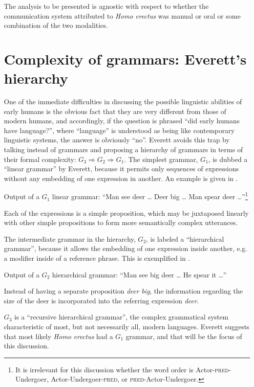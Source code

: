 \documentclass[output=paper,colorlinks,citecolor=brown]{langscibook}
\begin{document}
The analysis to be presented is agnostic with respect to whether the communication system attributed to \emph{Homo erectus} was manual or oral or some combination of the two modalities.

\section{Complexity of grammars: Everett’s hierarchy}\label{sec:vanvalin:2}
One of the immediate difficulties in discussing the possible linguistic abilities of early humans is the obvious fact that they are very different from those of modern humans, and accordingly, if the question is phrased “did early humans have language?”, where “language” is understood as being like contemporary linguistic systems, the answer is obviously “no”.  Everett avoids this trap by talking instead of grammars and proposing a hierarchy of grammars in terms of their formal complexity: $G_3 \Rightarrow G_2 \Rightarrow G_1$.  The simplest grammar, $G_1$, is dubbed a “linear grammar” by Everett, because it permits only sequences of expressions without any embedding of one expression in another. An example is given in .

\ea \label{vanvalin_example_1}
Output of a $G_1$ linear grammar: “Man see deer \ldots{}  Deer big \ldots{}  Man spear deer \ldots”\footnote{It is irrelevant for this discussion whether the word order is Actor-\textsc{pred}-Undergoer, Actor-Undergoer-\textsc{pred}, or \textsc{pred}-Actor-Undergoer.}
\z

Each of the expressions is a simple proposition, which may be juxtaposed linearly with other simple propositions to form more semantically complex utterances.

The intermediate grammar in the hierarchy, $G_2$, is labeled a “hierarchical grammar”, because it allows the embedding of one expression inside another, e.g. a modifier inside of a reference phrase.  This is exemplified in .

\ea \label{vanvalin_example_2}
Output of a $G_2$ hierarchical grammar: “Man see big deer \ldots{}  He spear it \ldots”
\z

Instead of having a separate proposition \emph{deer big}, the information regarding the size of the deer is incorporated into the referring expression \emph{deer}.

$G_3$ is a “recursive hierarchical grammar”, the complex grammatical system characteristic of most, but not necessarily all, modern languages.  Everett suggests that most likely \emph{Homo erectus} had a $G_1$ grammar, and that will be the focus of this discussion.
\end{document}

